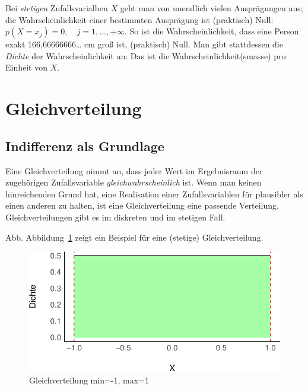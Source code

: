\documentclass[
  a4paper,
  DIV=11]{scrreprt}
\theoremstyle{definition}
\theoremstyle{remark}
\begin{document}
Bei \emph{stetigen} Zufallsvarialben \(X\) geht man von unendlich vielen
Ausprägungen aus; die Wahrscheinlichkeit einer bestimmten Ausprägung ist
(praktisch) Null: \(p(X=x_j)=0, \quad j=1,...,+\infty\). So ist die
Wahrscheinlichkeit, dass eine Person exakt 166,66666666\ldots{} cm groß
ist, (praktisch) Null. Man gibt stattdessen die \emph{Dichte} der
Wahrscheinlichkeit an: Das ist die Wahrscheinlichkeit(smasse) pro
Einheit von \(X\).

\hypertarget{gleichverteilung}{%
\section{Gleichverteilung}\label{gleichverteilung}}

\hypertarget{indifferenz-als-grundlage}{%
\subsection{Indifferenz als Grundlage}\label{indifferenz-als-grundlage}}

Eine Gleichverteilung nimmt an, dass jeder Wert im Ergebnisraum der
zugehörigen Zufallsvariable \emph{gleichwahrscheinlich} ist. Wenn man
keinen hinreichenden Grund hat, eine Realisation einer Zufallsvariablen
für plausibler als einen anderen zu halten, ist eine Gleichverteilung
eine passende Verteilung. Gleichverteilungen gibt es im diskreten und im
stetigen Fall.

Abb. Abbildung~\ref{fig-uniform} zeigt ein Beispiel für eine (stetige)
Gleichverteilung.

\begin{figure}

{\centering \includegraphics{./Verteilungen_files/figure-pdf/fig-uniform-1.pdf}

}

\caption{\label{fig-uniform}Gleichverteilung min=-1, max=1}

\end{figure}
\end{document}
